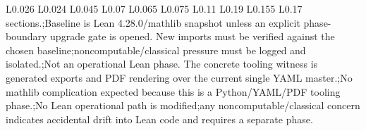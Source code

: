 \begin{longtable}{L{0.026\linewidth} L{0.024\linewidth} L{0.045\linewidth} L{0.07\linewidth} L{0.065\linewidth} L{0.075\linewidth} L{0.11\linewidth} L{0.19\linewidth} L{0.155\linewidth} L{0.17\linewidth}}
sections.;\newline Baseline is Lean 4.28.0/\allowbreak{}mathlib snapshot unless an explicit phase-boundary upgrade gate is opened. New imports must be verified against the chosen baseline;\newline noncomputable/\allowbreak{}classical pressure must be logged and isolated.;\newline Not an operational Lean phase. The concrete tooling witness is generated exports and PDF rendering over the current single YAML master.;\newline No mathlib complication expected because this is a Python/\allowbreak{}YAML/\allowbreak{}PDF tooling phase.;\newline No Lean operational path is modified;\newline any noncomputable/\allowbreak{}classical concern indicates accidental drift into Lean code and requires a separate phase.\\
\hline
\addlinespace[0.24em]

\end{longtable}
